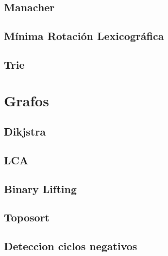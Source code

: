 \documentclass[a4paper,11pt,landscape,twocolumn]{article}
\begin{document}


\subsection{Manacher}



\subsection{Mínima Rotación Lexicográfica}



\subsection{Trie}



\section{Grafos}

\subsection{Dikjstra}



\subsection{LCA}



\subsection{Binary Lifting}



\subsection{Toposort}



\subsection{Deteccion ciclos negativos}
\end{document}
